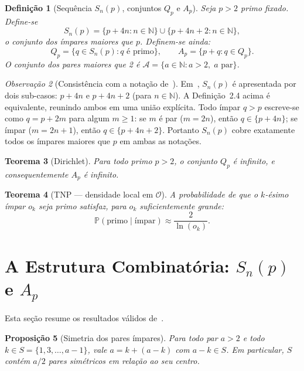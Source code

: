\documentclass[12pt,a4paper]{article}
\newtheorem{theorem}{Teorema}[section]
\newtheorem{proposition}[theorem]{Proposi\c{c}\~ao}
\newtheorem{definition}[theorem]{Defini\c{c}\~ao}
\theoremstyle{remark}
\newtheorem{remark}[theorem]{Observa\c{c}\~ao}
\newcommand{\calO}{\mathcal{O}}
\newcommand{\calA}{\mathcal{A}}
\newcommand{\NN}{\mathbb{N}}
\newcommand{\bP}{\mathbb{P}}
\begin{document}
	\begin{definition}[Sequência $S_n(p)$, conjuntos $Q_p$ e $A_p$]
		Seja $p>2$ primo fixado.  Define-se
		\[
		S_n(p) = \{p+4n : n\in\NN\}\cup\{p+4n+2 : n\in\NN\},
		\]
		o conjunto dos \'impares maiores que $p$.  Definem-se ainda:
		\[
		Q_p = \{q\in S_n(p) : q\text{ \'e primo}\},\qquad
		A_p = \{p+q : q\in Q_p\}.
		\]
		O conjunto dos pares maiores que 2 \'e
		$\calA = \{a\in\NN : a > 2,\; a\text{ par}\}$.
	\end{definition}
	
	\begin{remark}[Consist\^encia com a nota\c{c}\~ao de~\cite{bandeira2026estrutura}]
		Em~\cite{bandeira2026estrutura}, $S_n(p)$ \'e apresentada por dois sub-casos:
		$p+4n$ e $p+4n+2$ (para $n\in\NN$). A Defini\c{c}\~ao~2.4 acima \'e
		equivalente, reunindo ambos em uma uni\~ao expl\'icita.
		Todo \'impar $q > p$ escreve-se como $q = p + 2m$ para algum $m \geq 1$:
		se $m$ \'e par ($m = 2n$), ent\~ao $q \in \{p+4n\}$;
		se \'impar ($m = 2n+1$), ent\~ao $q \in \{p+4n+2\}$.
		Portanto $S_n(p)$ cobre exatamente todos os \'impares maiores que $p$
		em ambas as nota\c{c}\~oes.
	\end{remark}
	
	\begin{theorem}[Dirichlet]
		Para todo primo $p>2$, o conjunto $Q_p$ \'e infinito, e consequentemente $A_p$ \'e infinito.
	\end{theorem}
	
	\begin{theorem}[TNP --- densidade local em $\calO$]
		A probabilidade de que o $k$-\'esimo \'impar $o_k$ seja primo satisfaz,
		para $o_k$ suficientemente grande:
		\[
		\bP(\text{primo}\mid\text{\'impar}) \approx \frac{2}{\ln(o_k)}.
		\]
	\end{theorem}
	
	\section{A Estrutura Combinat\'oria: $S_n(p)$ e $A_p$}
	
	Esta se\c{c}\~ao resume os resultados v\'alidos de~\cite{bandeira2026estrutura}.
	
	\begin{proposition}[Simetria dos pares ímpares]
		Para todo par $a>2$ e todo $k\in S=\{1,3,\ldots,a-1\}$, vale
		$a = k + (a-k)$ com $a-k\in S$.  Em particular, $S$ cont\'em $a/2$ pares
		sim\'etricos em rela\c{c}\~ao ao seu centro.
	\end{proposition}
	
\end{document}
